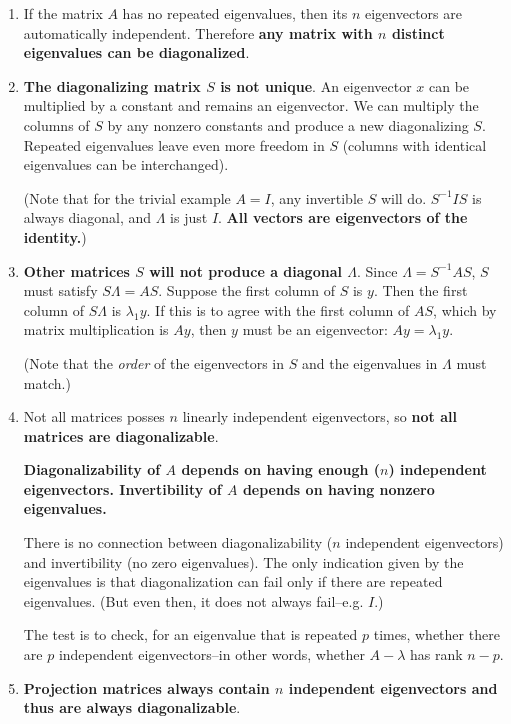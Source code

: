 \documentclass{article}
\begin{document}
\begin{enumerate}[1.]

\item If the matrix \(A\) has no repeated eigenvalues, then its \(n\) eigenvectors are automatically independent. Therefore \textbf{any matrix with \(n\) distinct eigenvalues can be diagonalized}.

\item \textbf{The diagonalizing matrix \(S\) is not unique}. An eigenvector \(x\) can be multiplied by a constant and remains an eigenvector. We can multiply the columns of \(S\) by any nonzero constants and produce a new diagonalizing \(S\). Repeated eigenvalues leave even more freedom in \(S\) (columns with identical eigenvalues can be interchanged). 

(Note that for the trivial example \(A = I\), any invertible \(S\) will do. \(S^{-1}IS\) is always diagonal, and \(\Lambda\) is just \(I\). \textbf{All vectors are eigenvectors of the identity.})

\item \textbf{Other matrices \(S\) will not produce a diagonal \(\Lambda\)}. Since \(\Lambda = S^{-1}AS\), \(S\) must satisfy \(S \Lambda = AS\). Suppose the first column of \(S\) is \(y\). Then the first column of \(S \Lambda\) is \(\lambda_1y\). If this is to agree with the first column of \(AS\), which by matrix multiplication is \(Ay\), then \(y\) must be an eigenvector: \(Ay = \lambda_1y\). 

(Note that the \textit{order} of the eigenvectors in \(S\) and the eigenvalues in \(\Lambda\) must match.)

\item Not all matrices posses \(n\) linearly independent eigenvectors, so \textbf{not all matrices are diagonalizable}. 

\textbf{Diagonalizability of \(A\) depends on having enough (\(n\)) independent eigenvectors. Invertibility of \(A\) depends on having nonzero eigenvalues.}

There is no connection between diagonalizability (\(n\) independent eigenvectors) and invertibility (no zero eigenvalues). The only indication given by the eigenvalues is that diagonalization can fail only if there are repeated eigenvalues. (But even then, it does not always fail--e.g. \(I\).)

The test is to check, for an eigenvalue that is repeated \(p\) times, whether there are \(p\) independent eigenvectors--in other words, whether \(A - \lambda\) has rank \(n - p\).


\item \textbf{Projection matrices always contain \(n\) independent eigenvectors and thus are always diagonalizable}.

\end{enumerate}
\end{document}
